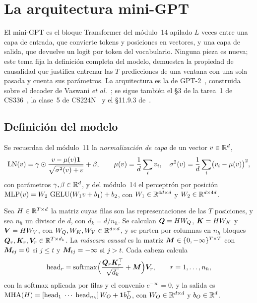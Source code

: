 \chapter{La arquitectura mini-GPT}
\label{tema:2}

El mini-GPT es el bloque Transformer del módulo~14 apilado $L$ veces entre una capa de entrada, que convierte tokens y posiciones en vectores, y una capa de salida, que devuelve un logit por token del vocabulario. Ninguna pieza es nueva; este tema fija la definición completa del modelo, demuestra la propiedad de causalidad que justifica entrenar las $T$ predicciones de una ventana con una sola pasada y cuenta sus parámetros. La arquitectura es la de GPT-2~\cite[§2.3]{gpt2}, construida sobre el decoder de Vaswani \emph{et al.}~\cite{vaswani}; se sigue también el §3 de la tarea~1 de CS336~\cite{cs336}, la clase~5 de CS224N~\cite{cs224n} y el §11.9.3 de~\cite{d2l}.

\section{Definición del modelo}

Se recuerdan del módulo~11 la \emph{normalización de capa} de un vector $v\in\mathbb{R}^{d}$,
\[
\operatorname{LN}(v)=\gamma\odot\frac{v-\mu(v)\mathbf 1}{\sqrt{\sigma^{2}(v)+\varepsilon}}+\beta,\qquad \mu(v)=\frac1d\sum_{i}v_i,\quad \sigma^{2}(v)=\frac1d\sum_i\bigl(v_i-\mu(v)\bigr)^{2},
\]
con parámetros $\gamma,\beta\in\mathbb{R}^{d}$, y del módulo~14 el perceptrón por posición $\operatorname{MLP}(v)=W_2\,\operatorname{GELU}(W_1v+b_1)+b_2$, con $W_1\in\mathbb{R}^{4d\times d}$ y $W_2\in\mathbb{R}^{d\times 4d}$.

\begin{definicion}\label{def:mha}
Sea $H\in\mathbb{R}^{T\times d}$ la matriz cuyas filas son las representaciones de las $T$ posiciones, y sea $n_h$ un divisor de $d$, con $d_k=d/n_h$. Se calculan $\bm{Q}=HW_Q$, $\bm{K}=HW_K$ y $\bm{V}=HW_V$, con $W_Q,W_K,W_V\in\mathbb{R}^{d\times d}$, y se parten por columnas en $n_h$ bloques $\bm{Q}_r,\bm{K}_r,\bm{V}_r\in\mathbb{R}^{T\times d_k}$. La \emph{máscara causal} es la matriz $\bm{M}\in\{0,-\infty\}^{T\times T}$ con $\bm{M}_{tj}=0$ si $j\le t$ y $\bm{M}_{tj}=-\infty$ si $j>t$. Cada cabeza calcula
\[
\mathrm{head}_r=\operatorname{softmax}\Bigl(\frac{\bm{Q}_r\bm{K}_r^{\top}}{\sqrt{d_k}}+\bm{M}\Bigr)\bm{V}_r,\qquad r=1,\dots,n_h,
\]
con la softmax aplicada por filas y el convenio $e^{-\infty}=0$, y la salida es
$\operatorname{MHA}(H)=[\mathrm{head}_1\;\cdots\;\mathrm{head}_{n_h}]\,W_O+\mathbf 1 b_O^{\top}$, con $W_O\in\mathbb{R}^{d\times d}$ y $b_O\in\mathbb{R}^{d}$.
\end{definicion}

